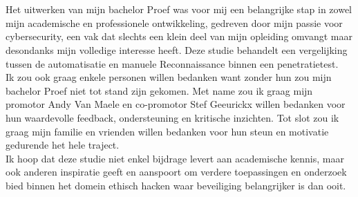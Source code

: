 
\chapter*{}%
\label{ch:voorwoord}


Het uitwerken van mijn bachelor Proef was voor mij een belangrijke stap in zowel mijn academische en professionele ontwikkeling, gedreven door mijn passie voor cybersecurity, een vak dat slechts een klein deel van mijn opleiding omvangt maar desondanks mijn volledige interesse heeft.
Deze studie behandelt een vergelijking tussen de automatisatie en manuele Reconnaissance binnen een penetratietest. \\

Ik zou ook graag enkele personen willen bedanken want zonder hun zou mijn bachelor Proef niet tot stand zijn gekomen.
Met name zou ik graag mijn promotor Andy Van Maele en co-promotor Stef Geeurickx willen bedanken voor hun waardevolle feedback, ondersteuning en kritische inzichten.
Tot slot zou ik graag mijn familie en vrienden willen bedanken voor hun steun en motivatie gedurende het hele traject. \\

Ik hoop dat deze studie niet enkel bijdrage levert aan academische kennis, maar ook anderen inspiratie geeft en aanspoort om verdere toepassingen en onderzoek bied binnen het domein ethisch hacken waar beveiliging belangrijker is dan ooit.

